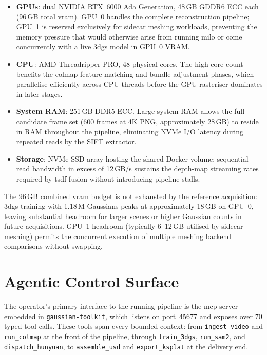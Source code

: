 \begin{itemize}
  \item \textbf{GPUs}: dual NVIDIA RTX~6000 Ada Generation, 48\,GB GDDR6 ECC each
        (96\,GB total \acrshort{vram}). GPU~0 handles the complete reconstruction
        pipeline; GPU~1 is reserved exclusively for sidecar meshing workloads,
        preventing the memory pressure that would otherwise arise from running
        \acrshort{milo} or \acrshort{come} concurrently with a live \acrshort{3dgs}
        model in GPU~0 VRAM.
  \item \textbf{CPU}: AMD Threadripper PRO, 48 physical cores. The high core count
        benefits the \acrshort{colmap} feature-matching and bundle-adjustment phases,
        which parallelise efficiently across CPU threads before the GPU rasteriser
        dominates in later stages.
  \item \textbf{System RAM}: 251\,GB DDR5 ECC. Large system RAM allows the full
        candidate frame set (600 frames at 4K PNG, approximately 28\,GB) to reside
        in RAM throughout the pipeline, eliminating NVMe I/O latency during repeated
        reads by the SIFT extractor.
  \item \textbf{Storage}: NVMe SSD array hosting the shared Docker volume; sequential
        read bandwidth in excess of 12\,GB/s sustains the depth-map streaming rates
        required by \acrshort{tsdf} fusion without introducing pipeline stalls.
\end{itemize}

The 96\,GB combined \acrshort{vram} budget is not exhausted by the reference acquisition:
\acrshort{3dgs} training with 1.18\,M Gaussians peaks at approximately 18\,GB on GPU~0,
leaving substantial headroom for larger scenes or higher Gaussian counts in future
acquisitions. GPU~1 headroom (typically 6–12\,GB utilised by sidecar meshing) permits
the concurrent execution of multiple meshing backend comparisons without swapping.

\section{Agentic Control Surface}\label{sec:control-surface}

The operator's primary interface to the running pipeline is the \acrshort{mcp} server
embedded in \texttt{gaussian-toolkit}, which listens on port~45677 and exposes
over 70 typed tool calls. These tools span every bounded context: from
\texttt{ingest\_video} and \texttt{run\_colmap} at the front of the pipeline,
through \texttt{train\_3dgs}, \texttt{run\_sam2}, and \texttt{dispatch\_hunyuan},
to \texttt{assemble\_usd} and \texttt{export\_ksplat} at the delivery end.

